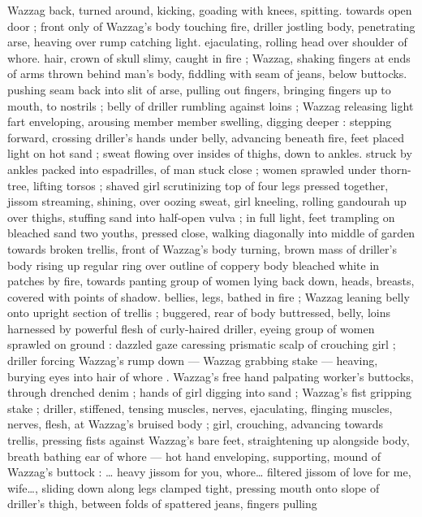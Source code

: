 {Wazzag back, turned around, kicking, goading with knees, spitting. 
towards open door ; front only of Wazzag's body touching fire, driller 
jostling body, penetrating arse, heaving over rump catching light. 
ejaculating, rolling head over shoulder of whore. hair, crown of skull 
slimy, caught in fire ; Wazzag, shaking fingers at ends of arms thrown 
behind man's body, fiddling with seam of jeans, below buttocks. 
pushing seam back into slit of arse, pulling out fingers, bringing 
fingers up to mouth, to nostrils ; belly of driller rumbling against 
loins ; Wazzag releasing light fart enveloping, arousing member 
member swelling, digging deeper : stepping forward, crossing 
driller's hands under belly, advancing beneath fire, feet placed light 
on hot sand ; sweat flowing over insides of thighs, down to ankles. 
struck by ankles packed into espadrilles, of man stuck close ; women 
sprawled under thorn-tree, lifting torsos ; shaved girl scrutinizing top 
of four legs pressed together, jissom streaming, shining, over oozing 
sweat, girl kneeling, rolling gandourah up over thighs, stuffing sand 
into half-open vulva ; in full light, feet trampling on bleached sand 
two youths, pressed close, walking diagonally into middle of garden 
towards broken trellis, front of Wazzag's body turning, brown mass 
of driller's body rising up regular ring over outline of coppery body 
bleached white in patches by fire, towards panting group of women 
lying back down, heads, breasts, covered with points of shadow. 
bellies, legs, bathed in fire ; Wazzag leaning belly onto upright 
section of trellis ; buggered, rear of body buttressed, belly, loins 
harnessed by powerful flesh of curly-haired driller, eyeing group of 
women sprawled on ground : dazzled gaze caressing prismatic scalp 
of crouching girl ; driller forcing Wazzag's rump down --- Wazzag 
grabbing stake --- heaving, burying eyes into hair of whore . 
Wazzag's free hand palpating worker's buttocks, through drenched 
denim ; hands of girl digging into sand ; Wazzag's fist gripping stake 
; driller, stiffened, tensing muscles, nerves, ejaculating, flinging 
muscles, nerves, flesh, at Wazzag's bruised body ; girl, crouching, 
advancing towards trellis, pressing fists against Wazzag's bare feet, 
straightening up alongside body, breath bathing ear of whore --- hot 
hand enveloping, supporting, mound of Wazzag's buttock : {\gl}{\ldots} heavy 
jissom for you, whore{\ldots} filtered jissom of love for me, wife{\ldots}{\gr}, sliding 
down along legs clamped tight, pressing mouth onto slope of 
driller's thigh, between folds of spattered jeans, fingers pulling 
}
